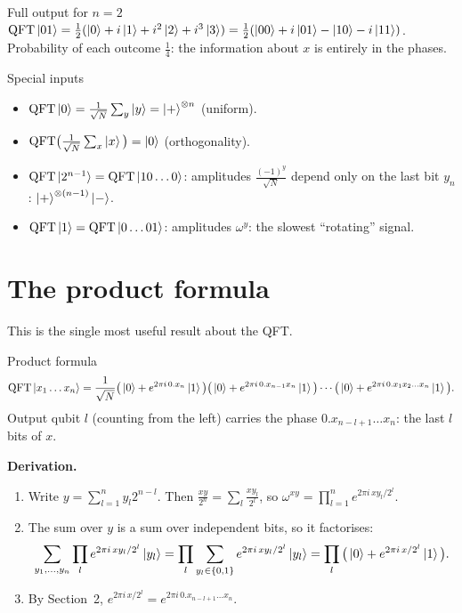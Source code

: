 \documentclass[11pt,a4paper,openany]{book}
\newcounter{wex}[chapter]
\newenvironment{steps}{\begin{enumerate}[label=\textbf{Step \arabic*.}, leftmargin=4.2em, itemsep=2pt]}{\end{enumerate}}
\newcommand{\QFT}{\mathrm{QFT}}
\begin{document}
\begin{wexample}{Full output for $n = 2$}
$\QFT\ket{01} = \frac12(\ket0 + i\ket1 + i^2\ket2 + i^3\ket3) = \frac12(\ket{00} + i\ket{01} - \ket{10} - i\ket{11})$. Probability of each outcome
$\frac14$: the information about $x$ is entirely in the phases.
\end{wexample}

\begin{keyres}{Special inputs}
\begin{itemize}[itemsep=1pt]
\item $\QFT\ket0 = \frac{1}{\sqrt N}\sum_y\ket y = \ket+^{\otimes n}$ (uniform).
\item $\QFT\big(\frac{1}{\sqrt N}\sum_x\ket x\big) = \ket0$ (orthogonality).
\item $\QFT\ket{2^{n-1}} = \QFT\ket{10\dots0}$: amplitudes $\frac{(-1)^y}{\sqrt N}$ depend only on the last bit $y_n$: $\ket+^{\otimes(n-1)}\ket-$.
\item $\QFT\ket{1} = \QFT\ket{0\dots01}$: amplitudes $\omega^y$: the slowest ``rotating'' signal.
\end{itemize}
\end{keyres}

\section{The product formula}
This is the single most useful result about the QFT.
\begin{keyres}{Product formula}
\[ \QFT\ket{x_1\dots x_n} = \frac{1}{\sqrt N}\big(\ket0 + e^{2\pi i\,0.x_n}\ket1\big)\big(\ket0 + e^{2\pi i\,0.x_{n-1}x_n}\ket1\big)\cdots\big(\ket0 + e^{2\pi i\,0.x_1x_2\dots x_n}\ket1\big). \]
Output qubit $l$ (counting from the left) carries the phase $0.x_{n-l+1}\dots x_n$: the last $l$ bits of $x$.
\end{keyres}
\textbf{Derivation.}
\begin{steps}
\item Write $y = \sum_{l=1}^{n} y_l 2^{n-l}$. Then $\frac{xy}{2^n} = \sum_l \frac{x y_l}{2^{l}}$, so $\omega^{xy} = \prod_{l=1}^{n} e^{2\pi i\,x y_l/2^l}$.
\item The sum over $y$ is a sum over independent bits, so it factorises:
      \[ \sum_{y_1,\dots,y_n}\prod_l e^{2\pi i\,xy_l/2^l}\ket{y_l} = \prod_l\sum_{y_l\in\{0,1\}} e^{2\pi i\,xy_l/2^l}\ket{y_l} = \prod_l\big(\ket0 + e^{2\pi i\,x/2^l}\ket1\big). \]
\item By Section~2, $e^{2\pi i\,x/2^l} = e^{2\pi i\,0.x_{n-l+1}\dots x_n}$.
\end{steps}
\end{document}
